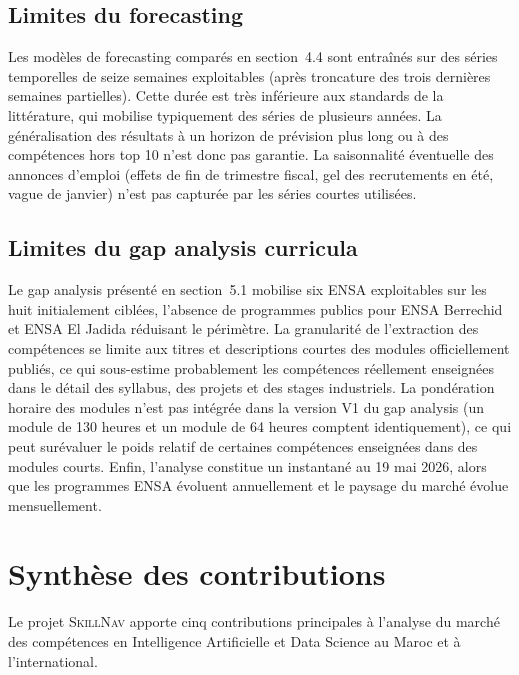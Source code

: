 \documentclass[11pt,a4paper,openany]{report}
\newcommand{\skillnav}{\textsc{SkillNav}\xspace}
\begin{document}
\subsection{Limites du forecasting}

Les mod\`eles de forecasting compar\'es en section~4.4 sont entra\^in\'es sur des s\'eries temporelles de seize semaines exploitables (apr\`es troncature des trois derni\`eres semaines partielles). Cette dur\'ee est tr\`es inf\'erieure aux standards de la litt\'erature, qui mobilise typiquement des s\'eries de plusieurs ann\'ees. La g\'en\'eralisation des r\'esultats \`a un horizon de pr\'evision plus long ou \`a des comp\'etences hors top 10 n'est donc pas garantie. La saisonnalit\'e \'eventuelle des annonces d'emploi (effets de fin de trimestre fiscal, gel des recrutements en \'et\'e, vague de janvier) n'est pas captur\'ee par les s\'eries courtes utilis\'ees.

\subsection{Limites du gap analysis curricula}

Le gap analysis pr\'esent\'e en section~5.1 mobilise six ENSA exploitables sur les huit initialement cibl\'ees, l'absence de programmes publics pour ENSA Berrechid et ENSA El Jadida r\'eduisant le p\'erim\`etre. La granularit\'e de l'extraction des comp\'etences se limite aux titres et descriptions courtes des modules officiellement publi\'es, ce qui sous-estime probablement les comp\'etences r\'eellement enseign\'ees dans le d\'etail des syllabus, des projets et des stages industriels. La pond\'eration horaire des modules n'est pas int\'egr\'ee dans la version V1 du gap analysis (un module de 130 heures et un module de 64 heures comptent identiquement), ce qui peut sur\'evaluer le poids relatif de certaines comp\'etences enseign\'ees dans des modules courts. Enfin, l'analyse constitue un instantan\'e au 19 mai 2026, alors que les programmes ENSA \'evoluent annuellement et le paysage du march\'e \'evolue mensuellement.

\section{Synth\`ese des contributions}

Le projet \skillnav apporte cinq contributions principales \`a l'analyse du march\'e des comp\'etences en Intelligence Artificielle et Data Science au Maroc et \`a l'international.
\end{document}
